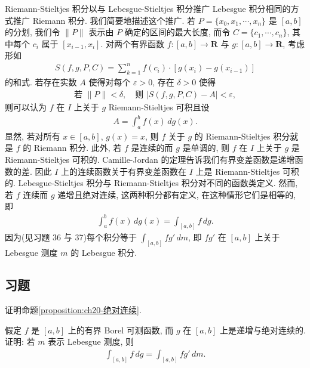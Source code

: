 \documentclass[../../main.tex]{subfiles}
\begin{document}
Riemann-Stieltjes 积分以与 Lebesgue-Stieltjes 积分推广 Lebesgue 积分相同的方式推广 Riemann 积分. 我们简要地描述这个推广. 若 $P=\{x_{0},x_{1},\cdots,x_{n}\}$ 是 $[a,b]$ 的分划, 我们令 $\|P\|$ 表示由 $P$ 确定的区间的最大长度, 而令 $C=\{c_{1},\cdots,c_{n}\}$, 其中每个 $c_{i}$ 属于 $[x_{i-1},x_{i}]$. 对两个有界函数 $f:[a,b]\to\mathbf{R}$ 与 $g:[a,b]\to\mathbf{R}$, 考虑形如
\begin{align*}
S(f,g,P,C)=\sum_{k=1}^{n}f(c_{i})\cdot[g(x_{i})-g(x_{i-1})]
\end{align*}
的和式. 若存在实数 $A$ 使得对每个 $\varepsilon>0$, 存在 $\delta>0$ 使得
\begin{align*}
\text{若 }\|P\|<\delta,\quad\text{则 }|S(f,g,P,C)-A|<\varepsilon,
\end{align*}
则可以认为 $f$ 在 $I$ 上关于 $g$ Riemann-Stieltjes 可积且设
\begin{align*}
A=\int_{a}^{b}f(x)\,dg(x).
\end{align*}
显然, 若对所有 $x\in[a,b]$, $g(x)=x$, 则 $f$ 关于 $g$ 的 Riemann-Stieltjes 积分就是 $f$ 的 Riemann 积分. 此外, 若 $f$ 是连续的而 $g$ 是单调的, 则 $f$ 在 $I$ 上关于 $g$ 是 Riemann-Stieltjes 可积的. Camille-Jordan 的定理告诉我们有界变差函数是递增函数的差. 因此 $I$ 上的连续函数关于有界变差函数在 $I$ 上是 Riemann-Stieltjes 可积的. Lebesgue-Stieltjes 积分与 Riemann-Stieltjes 积分对不同的函数类定义. 然而, 若 $f$ 连续而 $g$ 递增且绝对连续, 这两种积分都有定义, 在这种情形它们是相等的, 即
\begin{align*}
\int_{a}^{b}f(x)\,dg(x)=\int_{[a,b]}f\,dg.
\end{align*}
因为(见习题 36 与 37)每个积分等于 $\int_{[a,b]}fg'\,dm$, 即 $fg'$ 在 $[a,b]$ 上关于 Lebesgue 测度 $m$ 的 Lebesgue 积分.

\subsection*{习题}

\begin{exercise}\label{exercise:ch20-35}
证明命题\cref{proposition:ch20-绝对连续}.
\end{exercise}

\begin{exercise}\label{exercise:ch20-36}
假定 $f$ 是 $[a,b]$ 上的有界 Borel 可测函数, 而 $g$ 在 $[a,b]$ 上是递增与绝对连续的. 证明: 若 $m$ 表示 Lebesgue 测度, 则
\begin{align*}
\int_{[a,b]}f\,dg=\int_{[a,b]}fg'\,dm.
\end{align*}
\end{exercise}
\end{document}

